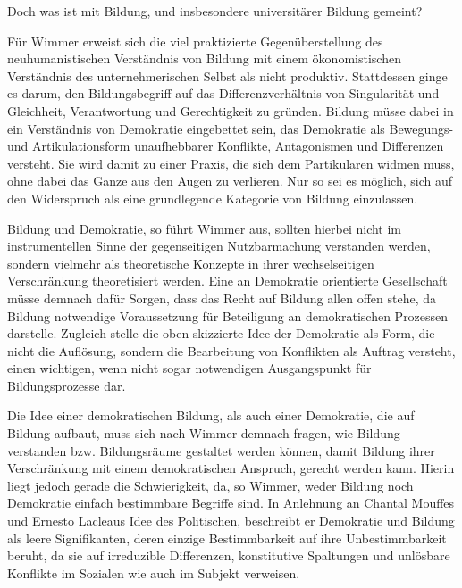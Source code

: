 \documentclass[11pt]{article}
\begin{document}
Doch was ist mit Bildung, und insbesondere universitärer
Bildung gemeint? 

Für Wimmer erweist sich die viel praktizierte Gegenüberstellung des
neuhumanistischen Verständnis von Bildung mit einem ökonomistischen Verständnis
des unternehmerischen Selbst als nicht produktiv. Stattdessen ginge es darum,
\glqq den Bildungsbegriff auf das Differenzverhältnis von Singularität und
Gleichheit, Verantwortung und Gerechtigkeit zu gründen.\grqq \footnotemark
{} Bildung müsse dabei
in ein Verständnis von Demokratie eingebettet sein, das Demokratie als
\glqq Bewegungs- und Artikulationsform unaufhebbarer Konflikte, Antagonismen und
Differenzen \grqq versteht. Sie wird damit zu einer Praxis, die sich dem
Partikularen widmen muss, ohne dabei das Ganze aus den Augen zu verlieren. Nur
so sei es möglich, sich auf den Widerspruch als eine grundlegende Kategorie von
Bildung einzulassen.

Bildung und Demokratie, so führt Wimmer aus, sollten
hierbei nicht im instrumentellen Sinne der gegenseitigen Nutzbarmachung
verstanden werden, sondern vielmehr als theoretische Konzepte in ihrer
wechselseitigen Verschränkung theoretisiert werden. Eine an Demokratie
orientierte Gesellschaft müsse demnach dafür Sorgen, dass das Recht auf Bildung
allen offen stehe, da Bildung notwendige Voraussetzung für Beteiligung an
demokratischen Prozessen darstelle. Zugleich stelle die oben skizzierte Idee
der Demokratie als Form, die nicht die Auflösung, sondern die Bearbeitung von
Konflikten als Auftrag versteht, einen wichtigen, wenn nicht sogar notwendigen
Ausgangspunkt für Bildungsprozesse dar.\footnotemark {} 

Die Idee einer demokratischen Bildung,
als auch einer Demokratie, die auf Bildung aufbaut, muss sich nach Wimmer
demnach fragen, wie Bildung verstanden bzw. Bildungsräume gestaltet werden
können, damit Bildung ihrer Verschränkung mit einem demokratischen Anspruch,
gerecht werden kann. Hierin liegt jedoch gerade die Schwierigkeit, da, so
Wimmer, weder Bildung noch Demokratie einfach bestimmbare Begriffe sind. In
Anlehnung an Chantal Mouffes und Ernesto Lacleaus Idee des Politischen,
beschreibt er Demokratie und Bildung als leere Signifikanten, deren einzige
Bestimmbarkeit auf ihre Unbestimmbarkeit beruht, da sie \glqq auf irreduzible
Differenzen, konstitutive Spaltungen und unlösbare Konflikte im Sozialen wie
auch im Subjekt\grqq \footnotemark {} verweisen. 
\end{document}
